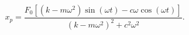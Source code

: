 \[x_p=\frac{F_0[(k-m\omega^2)\sin(\omega t)-c\omega\cos(\omega t)]}{(k-m\omega^2)^2+c^2\omega^2}.\]
